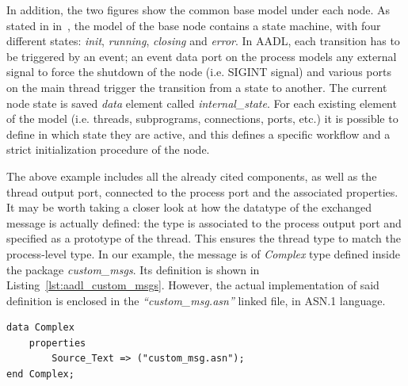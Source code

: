 In addition, the two figures show the common base model under each node. As stated in in~\cite{Bardaro2017}, the model of the base node contains a state machine, with four different states: \textit{init}, \textit{running}, \textit{closing} and \textit{error}. In AADL, each transition has to be triggered by an event; an event data port on the process models any external signal to force the shutdown of the node (i.e. SIGINT signal) and various ports on the main thread trigger the transition from a state to another. The current node state is saved \textit{data} element called \textit{internal\_state}. For each existing element of the model (i.e. threads, subprograms, connections, ports, etc.) it is possible to define in which state they are active, and this defines a specific workflow and a strict initialization procedure of the node.

The above example includes all the already cited components, as well as the thread output port, connected to the process port and the associated properties. It may be worth taking a closer look at how the datatype of the exchanged message is actually defined: the type is associated to the process output port and specified as a prototype of the thread. This ensures the thread type to match the process-level type.
In our example, the message is of \textit{Complex} type defined inside the package \textit{custom\_msgs}. Its definition is shown in Listing~\ref{lst:aadl_custom_msgs}. However, the actual implementation of said definition is enclosed in the \textit{``custom\_msg.asn''} linked file, in ASN.1 language.

\begin{lstlisting}[frame=tb,caption={AADL representation of a custom message},label=lst:aadl_custom_msgs]
data Complex
 	properties
 		Source_Text => ("custom_msg.asn");
end Complex;
\end{lstlisting}


